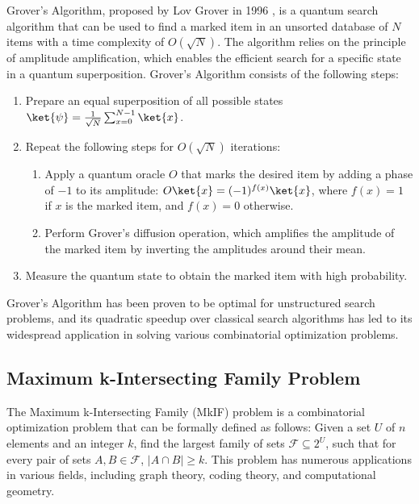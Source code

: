 Grover's Algorithm, proposed by Lov Grover in 1996 \cite{grover1996fast}, is a quantum search algorithm that can be used to find a marked item in an unsorted database of $N$ items with a time complexity of $O(\sqrt{N})$. The algorithm relies on the principle of amplitude amplification, which enables the efficient search for a specific state in a quantum superposition. Grover's Algorithm consists of the following steps:

\begin{enumerate}
    \item Prepare an equal superposition of all possible states $\ket{\psi} = \frac{1}{\sqrt{N}}\sum_{x=0}^{N-1}\ket{x}$.
    \item Repeat the following steps for $O(\sqrt{N})$ iterations:
    \begin{enumerate}
        \item Apply a quantum oracle $O$ that marks the desired item by adding a phase of $-1$ to its amplitude: $O\ket{x} = (-1)^{f(x)}\ket{x}$, where $f(x) = 1$ if $x$ is the marked item, and $f(x) = 0$ otherwise.
        \item Perform Grover's diffusion operation, which amplifies the amplitude of the marked item by inverting the amplitudes around their mean.
    \end{enumerate}
    \item Measure the quantum state to obtain the marked item with high probability.
\end{enumerate}

Grover's Algorithm has been proven to be optimal for unstructured search problems, and its quadratic speedup over classical search algorithms has led to its widespread application in solving various combinatorial optimization problems.

\subsection{Maximum k-Intersecting Family Problem}
\label{subsec:mkif_problem}

The Maximum k-Intersecting Family (MkIF) problem is a combinatorial optimization problem that can be formally defined as follows: Given a set $U$ of $n$ elements and an integer $k$, find the largest family of sets $\mathcal{F} \subseteq 2^U$, such that for every pair of sets $A, B \in \mathcal{F}$, $|A \cap B| \geq k$. This problem has numerous applications in various fields, including graph theory, coding theory, and computational geometry.

